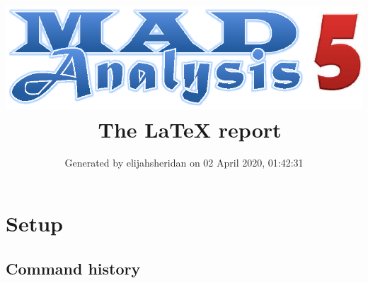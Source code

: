\documentclass[a4paper, 10pt]{article}
\title{{\includegraphics[scale=.4]{logo.eps}}\ The LaTeX report}
\author{Generated by elijahsheridan on 02 April 2020, 01:42:31}
\begin{document}
\maketitle
\flushbottom

\newpage
\section{ Setup}

\subsection{ Command history}
\end{document}
